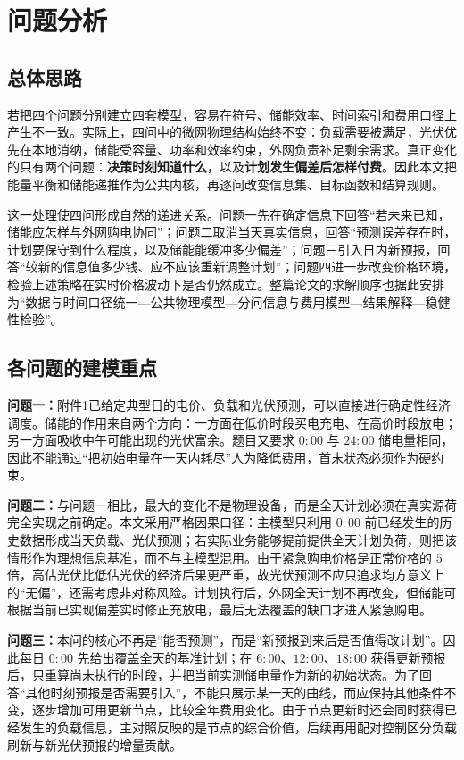 \section{问题分析}

\subsection{总体思路}

若把四个问题分别建立四套模型，容易在符号、储能效率、时间索引和费用口径上产生不一致。实际上，四问中的微网物理结构始终不变：负载需要被满足，光伏优先在本地消纳，储能受容量、功率和效率约束，外网负责补足剩余需求。真正变化的只有两个问题：\textbf{决策时刻知道什么}，以及\textbf{计划发生偏差后怎样付费}。因此本文把能量平衡和储能递推作为公共内核，再逐问改变信息集、目标函数和结算规则。

这一处理使四问形成自然的递进关系。问题一先在确定信息下回答“若未来已知，储能应怎样与外网购电协同”；问题二取消当天真实信息，回答“预测误差存在时，计划要保守到什么程度，以及储能能缓冲多少偏差”；问题三引入日内新预报，回答“较新的信息值多少钱、应不应该重新调整计划”；问题四进一步改变价格环境，检验上述策略在实时价格波动下是否仍然成立。整篇论文的求解顺序也据此安排为“数据与时间口径统一—公共物理模型—分问信息与费用模型—结果解释—稳健性检验”。

\subsection{各问题的建模重点}

\indent\textbf{问题一：}附件1已给定典型日的电价、负载和光伏预测，可以直接进行确定性经济调度。储能的作用来自两个方向：一方面在低价时段买电充电、在高价时段放电；另一方面吸收中午可能出现的光伏富余。题目又要求 $0{:}00$ 与 $24{:}00$ 储电量相同，因此不能通过“把初始电量在一天内耗尽”人为降低费用，首末状态必须作为硬约束。

\indent\textbf{问题二：}与问题一相比，最大的变化不是物理设备，而是全天计划必须在真实源荷完全实现之前确定。本文采用严格因果口径：主模型只利用 $0{:}00$ 前已经发生的历史数据形成当天负载、光伏预测；若实际业务能够提前提供全天计划负荷，则把该情形作为理想信息基准，而不与主模型混用。由于紧急购电价格是正常价格的 $5$ 倍，高估光伏比低估光伏的经济后果更严重，故光伏预测不应只追求均方意义上的“无偏”，还需考虑非对称风险。计划执行后，外网全天计划不再改变，但储能可根据当前已实现偏差实时修正充放电，最后无法覆盖的缺口才进入紧急购电。

\indent\textbf{问题三：}本问的核心不再是“能否预测”，而是“新预报到来后是否值得改计划”。因此每日 $0{:}00$ 先给出覆盖全天的基准计划；在 $6{:}00$、$12{:}00$、$18{:}00$ 获得更新预报后，只重算尚未执行的时段，并把当前实测储电量作为新的初始状态。为了回答“其他时刻预报是否需要引入”，不能只展示某一天的曲线，而应保持其他条件不变，逐步增加可用更新节点，比较全年费用变化。由于节点更新时还会同时获得已经发生的负载信息，主对照反映的是节点的综合价值，后续再用配对控制区分负载刷新与新光伏预报的增量贡献。

